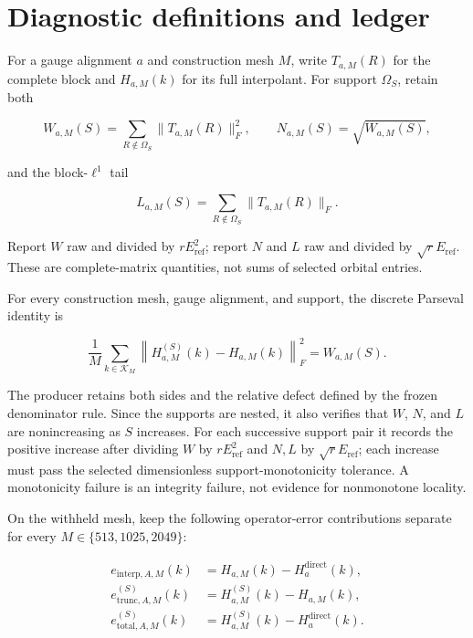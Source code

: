 \documentclass[11pt]{article}
\begin{document}
\section{Diagnostic definitions and ledger}

For a gauge alignment $a$ and construction mesh $M$, write $T_{a,M}(R)$ for the complete block
and $H_{a,M}(k)$ for its full interpolant. For support $\Omega_S$, retain both

\[
W_{a,M}(S)=\sum_{R\notin\Omega_S}\|T_{a,M}(R)\|_F^2,
\qquad
N_{a,M}(S)=\sqrt{W_{a,M}(S)},
\]

and the block-$\ell^1$ tail

\[
L_{a,M}(S)=\sum_{R\notin\Omega_S}\|T_{a,M}(R)\|_F.
\]

Report $W$ raw and divided by $rE_{\mathrm{ref}}^2$; report $N$ and $L$ raw and divided
by $\sqrt rE_{\mathrm{ref}}$. These are complete-matrix quantities, not sums of selected
orbital entries.

For every construction mesh, gauge alignment, and support, the discrete Parseval identity is

\begin{equation}
 \frac1M\sum_{k\in\mathcal K_M}
 \left\lVert H_{a,M}^{(S)}(k)-H_{a,M}(k)\right\rVert_F^2
 =W_{a,M}(S).
 \label{eq:diagnostic-parseval}
\end{equation}

The producer retains both sides and the relative defect defined by the frozen denominator
rule. Since the supports are nested, it also verifies that $W$, $N$, and $L$ are
nonincreasing as $S$ increases. For each successive support pair it records the positive
increase after dividing $W$ by $rE_{\mathrm{ref}}^2$ and $N,L$ by
$\sqrt rE_{\mathrm{ref}}$; each increase must pass the selected dimensionless
support-monotonicity tolerance. A monotonicity failure is an integrity failure, not
evidence for nonmonotone locality.

On the withheld mesh, keep the following operator-error contributions separate for every
$M\in\{513,1025,2049\}$:

\begin{equation}
\begin{aligned}
e_{\mathrm{interp},A,M}(k)
 &=H_{a,M}(k)-H_a^{\mathrm{direct}}(k),\\
e_{\mathrm{trunc},A,M}^{(S)}(k)
 &=H_{a,M}^{(S)}(k)-H_{a,M}(k),\\
e_{\mathrm{total},A,M}^{(S)}(k)
 &=H_{a,M}^{(S)}(k)-H_a^{\mathrm{direct}}(k).
\end{aligned}
\label{eq:diagnostic-error-channels}
\end{equation}
\end{document}
